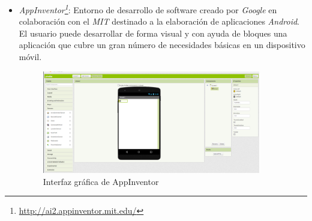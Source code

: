 \begin{itemize}
    \item \textit{AppInventor\footnote{\url{http://ai2.appinventor.mit.edu/}}}: Entorno de desarrollo de software creado por \textit{Google} en colaboración con el \textit{MIT} destinado a la elaboración de aplicaciones \textit{Android}. El usuario puede desarrollar de forma visual y con ayuda de bloques una aplicación que cubre un gran número de necesidades básicas en un dispositivo móvil.
        \begin{figure}[H]
        \centering
        \includegraphics[width=0.9\textwidth]{img/AppInventor.png}
        \caption{Interfaz gráfica de AppInventor} \label{fig:appinventor}
    \end{figure}
    
\end{itemize}


